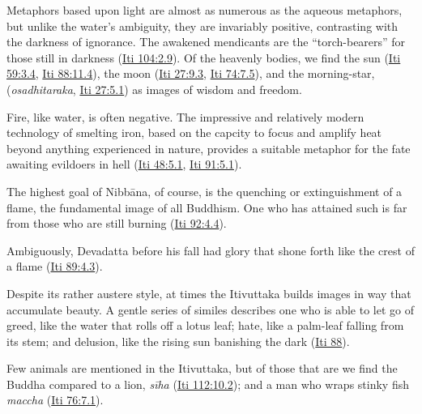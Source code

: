 \documentclass[12pt,openany]{book}%
\begin{document}
Metaphors based upon light are almost as numerous as the aqueous metaphors, but unlike the water’s ambiguity, they are invariably positive, contrasting with the darkness of ignorance. The awakened mendicants are the “torch-bearers” for those still in darkness (\href{https://suttacentral.net/iti104/en/sujato\#2.9}{Iti 104:2.9}).  Of the heavenly bodies, we find the sun (\href{https://suttacentral.net/iti59/en/sujato\#3.4}{Iti 59:3.4}, \href{https://suttacentral.net/iti88/en/sujato\#11.4}{Iti 88:11.4}), the moon (\href{https://suttacentral.net/iti27/en/sujato\#9.3}{Iti 27:9.3}, \href{https://suttacentral.net/iti74/en/sujato\#7.5}{Iti 74:7.5}), and the morning-star, (\emph{osadhitaraka}, \href{https://suttacentral.net/iti27/en/sujato\#5.1}{Iti 27:5.1}) as images of wisdom and freedom.

Fire, like water, is often negative. The impressive and relatively modern technology of smelting iron, based on the capcity to focus and amplify heat beyond anything experienced in nature, provides a suitable metaphor for the fate awaiting evildoers in hell (\href{https://suttacentral.net/iti48/en/sujato\#5.1}{Iti 48:5.1}, \href{https://suttacentral.net/iti91/en/sujato\#5.1}{Iti 91:5.1}).

The highest goal of \textsanskrit{Nibbāna}, of course, is the quenching or extinguishment of a flame, the fundamental image of all Buddhism. One who has attained such is far from those who are still burning (\href{https://suttacentral.net/iti92/en/sujato\#4.4}{Iti 92:4.4}).

Ambiguously, Devadatta before his fall had glory that shone forth like the crest of a flame (\href{https://suttacentral.net/iti89/en/sujato\#4.3)}{Iti 89:4.3}).

Despite its rather austere style, at times the Itivuttaka builds images in way that accumulate beauty. A gentle series of similes describes one who is able to let go of greed, like the water that rolls off a lotus leaf; hate, like a palm-leaf falling from its stem; and delusion, like the rising sun banishing the dark (\href{https://suttacentral.net/iti88/en/sujato}{Iti 88}).

Few animals are mentioned in the Itivuttaka, but of those that are we find the Buddha compared to a lion, \emph{\textsanskrit{sīha}} (\href{https://suttacentral.net/iti112/en/sujato\#10.2}{Iti 112:10.2}); and a man who wraps stinky fish  \emph{maccha} (\href{https://suttacentral.net/iti76/en/sujato\#7.1}{Iti 76:7.1}).
\end{document}
